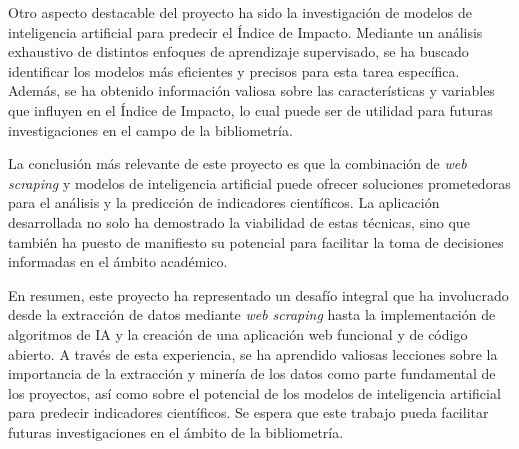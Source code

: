 Otro aspecto destacable del proyecto ha sido la investigación de modelos de inteligencia artificial para predecir el Índice de Impacto. Mediante un análisis exhaustivo de distintos enfoques de aprendizaje supervisado, se ha buscado identificar los modelos más eficientes y precisos para esta tarea específica. Además, se ha obtenido información valiosa sobre las características y variables que influyen en el Índice de Impacto, lo cual puede ser de utilidad para futuras investigaciones en el campo de la bibliometría.

La conclusión más relevante de este proyecto es que la combinación de \textit{web scraping} y modelos de inteligencia artificial puede ofrecer soluciones prometedoras para el análisis y la predicción de indicadores científicos. La aplicación desarrollada no solo ha demostrado la viabilidad de estas técnicas, sino que también ha puesto de manifiesto su potencial para facilitar la toma de decisiones informadas en el ámbito académico. 

En resumen, este proyecto ha representado un desafío integral que ha involucrado desde la extracción de datos mediante \textit{web scraping} hasta la implementación de algoritmos de IA y la creación de una aplicación web funcional y de código abierto. A través de esta experiencia, se ha aprendido valiosas lecciones sobre la importancia de la extracción y minería de los datos como parte fundamental de los proyectos, así como sobre el potencial de los modelos de inteligencia artificial para predecir indicadores científicos. Se espera que este trabajo pueda facilitar futuras investigaciones en el ámbito de la bibliometría.



